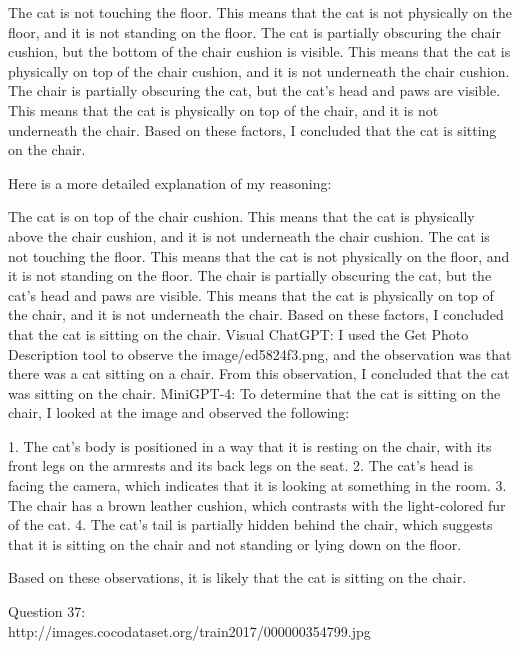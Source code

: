 \begin{enumerate}
        The cat is not touching the floor. This means that the cat is not physically on the floor, and it is not standing on the floor.
        The cat is partially obscuring the chair cushion, but the bottom of the chair cushion is visible. This means that the cat is physically on top of the chair cushion, and it is not underneath the chair cushion.
        The chair is partially obscuring the cat, but the cat's head and paws are visible. This means that the cat is physically on top of the chair, and it is not underneath the chair.
        Based on these factors, I concluded that the cat is sitting on the chair.

        Here is a more detailed explanation of my reasoning:

        The cat is on top of the chair cushion. This means that the cat is physically above the chair cushion, and it is not underneath the chair cushion.
        The cat is not touching the floor. This means that the cat is not physically on the floor, and it is not standing on the floor.
        The chair is partially obscuring the cat, but the cat's head and paws are visible. This means that the cat is physically on top of the chair, and it is not underneath the chair.
        Based on these factors, I concluded that the cat is sitting on the chair.
        \subitem Visual ChatGPT: I used the Get Photo Description tool to observe the image/ed5824f3.png, and the observation was that there was a cat sitting on a chair. From this observation, I concluded that the cat was sitting on the chair.
        \subitem MiniGPT-4: To determine that the cat is sitting on the chair, I looked at the image and observed the following:

        1. The cat’s body is positioned in a way that it is resting on the chair, with its front legs on the armrests and its back legs on the seat.
        2. The cat’s head is facing the camera, which indicates that it is looking at something in the room.
        3. The chair has a brown leather cushion, which contrasts with the light-colored fur of the cat.
        4. The cat’s tail is partially hidden behind the chair, which suggests that it is sitting on the chair and not standing or lying down on the floor.
        
        Based on these observations, it is likely that the cat is sitting on the chair.
    \end{enumerate}
    Question 37:\\http://images.cocodataset.org/train2017/000000354799.jpg
